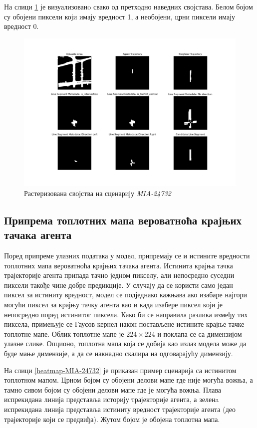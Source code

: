 \documentclass[11pt,oneside]{memoir}
\begin{document}
На слици \ref{raster-MIA-24732} је визуализованo свако од претходно наведних својстава. Белом бојом су обојени пиксели који имају вредност 1,
а необојени, црни пиксели имају вредност 0. 

\begin{figure}[H]
  \centering
  \includegraphics[width=1.0\textwidth]{images/raster_MIA_24732.png}
  \caption{Растеризована својства на сценарију \textit{MIA-24732} \label{raster-MIA-24732}}
\end{figure}

\subsection{Припрема топлотних мапа вероватноћа крајњих тачака агента}

Поред припреме улазних података у модел, припремају се и истините вредности топлотних мапа вероватноћа крајњих тачака агента. 
Истинита крајња тачка трајекторије агента припада тачно једном пикселу, али непосредно суседни пиксели такође чине добре предикције. 
У случају да се користи само један пиксел за истиниту вредност, модел се подједнако кажњава ако изабаре најгори могући пиксел 
за крајњу тачку агента као и када изабере пиксел који је непосредно поред истинитог пиксела. 
Како би се направила разлика између тих пиксела, примењује се Гаусов кернел након постављене истините крајње тачке топлотне мапе. 
Облик топлотне мапе је $224\times 224$ и поклапа се са димензијом улазне слике. 
Опционо, топлотна мапа која се добија као излаз модела може да буде мање димензије, а да се накнадно скалира на одговарајућу димензију. 

На слици \ref{heatmap-MIA-24732} је приказан пример сценарија са истинитом топлотном мапом. Црном бојом су обојени делови мапе
где није могућа вожња, а тамно сивом бојом су обојени делови мапе где је могућа вожња. Плава испрекидана линија представља историју
трајекторије агента, а зеленa испрекидана линија представља истиниту вредност трајекторије агента (део трајекторије који се предвиђа). Жутом бојом
је обојена топлотна мапа.
\end{document}
